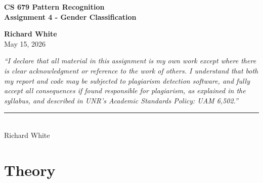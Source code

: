 \documentclass[12pt, letterpaper]{article}
\begin{document}
\begin{titlepage}
	\centering
	\vspace*{2cm}

	{\LARGE \textbf{CS 679 Pattern Recognition}}\\[0.5cm]

	{\Large \textbf{Assignment 4 - Gender Classification}}\\[0.5cm]

	\vfill

	{\large \textbf{Richard White}}\\[0.3cm]
	{\normalsize May 15, 2026}\\[1cm]

	\vfill

	\begin{minipage}{0.85\textwidth}
		\small
		\textit{``I declare that all material in this assignment is my own work except where there is clear
			acknowledgment or reference to the work of others. I understand that both my report and code may be
			subjected to plagiarism detection software, and fully accept all consequences if found responsible for
			plagiarism, as explained in the syllabus, and described in UNR’s Academic Standards Policy: UAM
			6,502.''}

		\vspace{1cm}
		\noindent\rule{6cm}{0.4pt}\\
		Richard White
	\end{minipage}

	\vspace{2cm}
\end{titlepage}

\tableofcontents
\newpage

\section{Theory}
\label{sec:theory}
\end{document}
